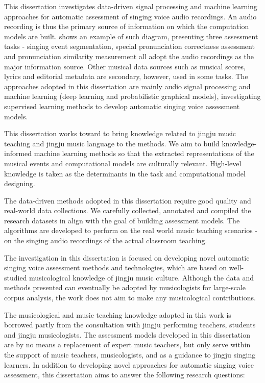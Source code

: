 This dissertation investigates data-driven signal processing and machine learning approaches for automatic assessment of singing voice audio recordings. An audio recording is thus the primary source of information on which the computation models are built.  shows an example of such diagram, presenting three assessment tasks - singing event segmentation, special pronunciation correctness assessment and pronunciation similarity measurement all adopt the audio recordings as the major information source. Other musical data sources such as musical scores, lyrics and editorial metadata are secondary, however, used in some tasks. The approaches adopted in this dissertation are mainly audio signal processing and machine learning (deep learning and probabilistic graphical models), investigating supervised learning methods to develop automatic singing voice assessment models.

This dissertation works toward to bring knowledge related to jingju music teaching and jingju music language to the methods. We aim to build knowledge-informed machine learning methods so that the extracted representations of the musical events and computational models are culturally relevant. High-level knowledge is taken as the determinants in the task and computational model designing.

The data-driven methods adopted in this dissertation require good quality and real-world data collections. We carefully collected, annotated and compiled the research datasets in align with the goal of building assessment models. The algorithms are developed to perform on the real world music teaching scenarios - on the singing audio recordings of the actual classroom teaching.

The investigation in this dissertation is focused on developing novel automatic singing voice assessment methods and technologies, which are based on well-studied musicological knowledge of jingju music culture. Although the data and methods presented can eventually be adopted by musicologists for large-scale corpus analysis, the work does not aim to make any musicological contributions.

The musicological and music teaching knowledge adopted in this work is borrowed partly from the consultation with jingju performing teachers, students and jingju musicologists. The assessment models developed in this dissertation are by no means a replacement of expert music teachers, but only serve within the support of music teachers, musicologists, and as a guidance to jingju singing learners. In addition to developing novel approaches for automatic singing voice assessment, this dissertation aims to answer the following research questions:

